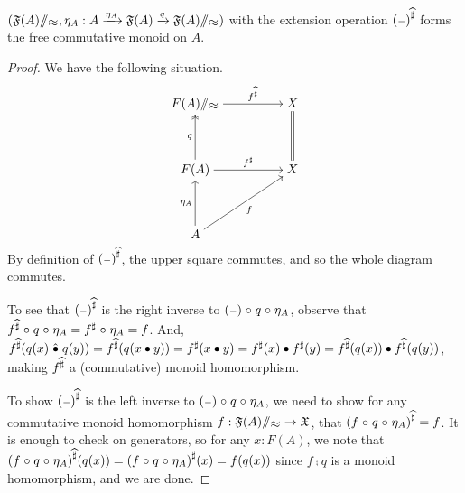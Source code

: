 \begin{propositionrep}
    \label{prop:qfreemon}
    \leavevmode
    $({{\displaystyle \mathfrak{F}(A)}}{\sslash}{_{\displaystyle \approx}}, \eta_A : {A \xrightarrow{\eta_A} \mathfrak{F}(A) \xrightarrow{q} {{\displaystyle \mathfrak{F}(A)}}{\sslash}{_{\displaystyle \approx}}})$
    with the extension operation $\exthat{(\blank)}$ forms the free commutative monoid on $A$.
\end{propositionrep}
\begin{proof}
    We have the following situation.
    \[\begin{tikzcd}[ampersand replacement=\&,cramped]
            {\quot{F(A)}{\approx}} \&\& X \\
            \\
            {F(A)} \&\& X \\
            \\
            A
            \arrow["{\exthat{f}}", from=1-1, to=1-3]
            \arrow["q", two heads, from=3-1, to=1-1]
            \arrow["{\ext{f}}", from=3-1, to=3-3]
            \arrow[equals, from=3-3, to=1-3]
            \arrow["{\eta_{A}}", from=5-1, to=3-1]
            \arrow["f"', from=5-1, to=3-3]
        \end{tikzcd}\]
    By definition of $\exthat{(\blank)}$, the upper square commutes, and so the whole diagram commutes.

    To see that $\exthat{(\blank)}$ is the right inverse to $(\blank) \comp q \comp \eta_A$,
    observe that ${f}^{\widehat{\sharp}} \mathrel{\circ} q \mathrel{\circ} \eta_A = {f}^{\sharp} \mathrel{\circ} \eta_A = f$.
    And,
    ${f}^{\widehat{\sharp}}(q(x) \mathrel{\hat{\mathbin{\bullet}}} q(y))
        = {f}^{\widehat{\sharp}}{(q(x \mathbin{\bullet} y))}
        = {f}^{\sharp}(x \mathbin{\bullet} y) = {f}^{\sharp}(x) \mathbin{\bullet} {f}^{\sharp}(y)
        = {f}^{\widehat{\sharp}}(q(x)) \mathbin{\bullet} {f}^{\widehat{\sharp}}(q(y))
    $,
    making ${f}^{\widehat{\sharp}}$ a (commutative) monoid homomorphism.

    To show $\exthat{(\blank)}$ is the left inverse to $(\blank) \comp q \comp \eta_A$,
    we need to show for any commutative monoid homomorphism
    $f : {{\displaystyle \mathfrak{F}(A)}}{\sslash}{_{\displaystyle \approx}} \to \mathfrak{X}$, that ${(f \mathrel{\circ} q \mathrel{\circ} \eta_A)}^{\widehat{\sharp}} = f$.
    It is enough to check on generators, so for any $x : F(A)$,
    we note that ${(f \mathrel{\circ} q \mathrel{\circ} \eta_A)}^{\widehat{\sharp}}(q(x)) = {(f \mathrel{\circ} q \mathrel{\circ} \eta_A)}^{\sharp}(x) = f(q(x))$
    since $f \comp q$ is a monoid homomorphism, and we are done.


\end{proof}
